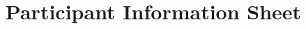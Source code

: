\documentclass[12pt]{article}
\begin{document}
\title{Participant Information Sheet}
\maketitle

\end{document}
